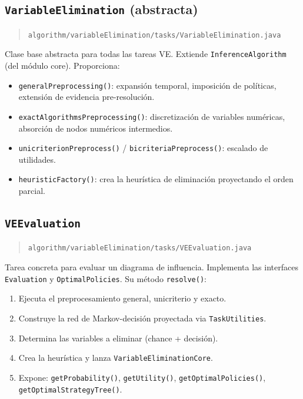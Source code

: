 \documentclass[11pt,a4paper]{article}
\newcommand{\clase}[1]{\texttt{#1}}
\newcommand{\metodo}[1]{\texttt{#1()}}
\begin{document}
\subsection{\clase{VariableElimination} (abstracta)}

\begin{quote}
\texttt{algorithm/variableElimination/tasks/VariableElimination.java}
\end{quote}

Clase base abstracta para todas las tareas VE. Extiende \clase{InferenceAlgorithm}
(del m\'{o}dulo core). Proporciona:

\begin{itemize}
  \item \metodo{generalPreprocessing}: expansi\'{o}n temporal, imposici\'{o}n de
        pol\'{i}ticas, extensi\'{o}n de evidencia pre-resoluci\'{o}n.
  \item \metodo{exactAlgorithmsPreprocessing}: discretizaci\'{o}n de variables
        num\'{e}ricas, absorci\'{o}n de nodos num\'{e}ricos intermedios.
  \item \metodo{unicriterionPreprocess} / \metodo{bicriteriaPreprocess}:
        escalado de utilidades.
  \item \metodo{heuristicFactory}: crea la heur\'{i}stica de eliminaci\'{o}n
        proyectando el orden parcial.
\end{itemize}

\subsection{\clase{VEEvaluation}}

\begin{quote}
\texttt{algorithm/variableElimination/tasks/VEEvaluation.java}
\end{quote}

Tarea concreta para evaluar un diagrama de influencia. Implementa las interfaces
\clase{Evaluation} y \clase{OptimalPolicies}. Su m\'{e}todo \metodo{resolve}:

\begin{enumerate}
  \item Ejecuta el preprocesamiento general, unicriterio y exacto.
  \item Construye la red de Markov-decisi\'{o}n proyectada via \clase{TaskUtilities}.
  \item Determina las variables a eliminar (chance + decisi\'{o}n).
  \item Crea la heur\'{i}stica y lanza \clase{VariableEliminationCore}.
  \item Expone: \metodo{getProbability}, \metodo{getUtility},
        \metodo{getOptimalPolicies}, \metodo{getOptimalStrategyTree}.
\end{enumerate}
\end{document}
